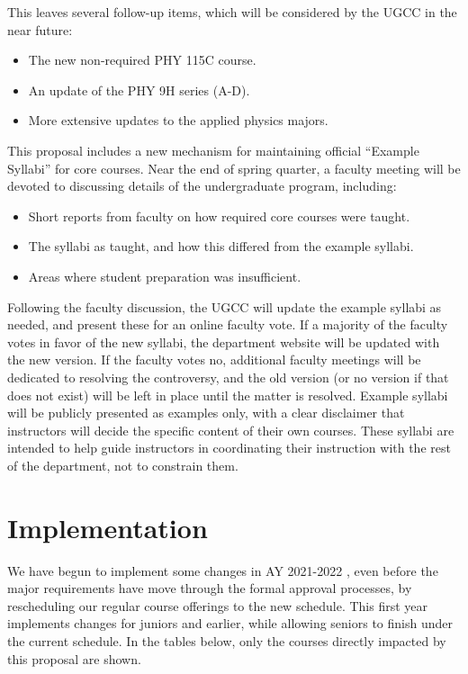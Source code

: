 \documentclass[12pt]{article}
\begin{document}
This leaves several follow-up items, which will be considered by the UGCC in the near future:
\begin{itemize}
 \item The new non-required PHY 115C course.
 \item An update of the PHY 9H series (A-D).
 \item More extensive updates to the applied physics majors.
\end{itemize}
This proposal includes a new mechanism for maintaining official
``Example Syllabi'' for core courses.  Near the end of spring quarter,
a faculty meeting will be devoted to discussing details of the
undergraduate program, including:
\begin{itemize} 
 \item Short reports from faculty on how required core courses were taught.
 \item The syllabi as taught, and how this differed from the example syllabi.
 \item Areas where student preparation was insufficient.
\end{itemize}
Following the faculty discussion, the UGCC will update the example
syllabi as needed, and present these for an online faculty vote.  If a
majority of the faculty votes in favor of the new syllabi, the
department website will be updated with the new version.  If the
faculty votes no, additional faculty meetings will be dedicated to
resolving the controversy, and the old version (or no version if that
does not exist) will be left in place until the matter is resolved.
Example syllabi will be publicly presented as examples only, with a
clear disclaimer that instructors will decide the specific content of
their own courses.  These syllabi are intended to help guide
instructors in coordinating their instruction with the rest of the
department, not to constrain them.

\section{Implementation}
\label{sec:implementation}

We have begun to implement some changes in AY 2021-2022 , even before
the major requirements have move through the formal approval
processes, by rescheduling our regular course offerings to the new
schedule.  This first year implements changes for juniors and
earlier, while allowing seniors to finish under the current schedule.
In the tables below, only the courses directly impacted by this
proposal are shown.
\end{document}
